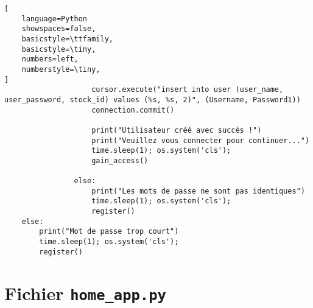 \begin{lstlisting}[
    language=Python
    showspaces=false,
    basicstyle=\ttfamily,
    basicstyle=\tiny,
    numbers=left,
    numberstyle=\tiny,
]
                    cursor.execute("insert into user (user_name, user_password, stock_id) values (%s, %s, 2)", (Username, Password1))
                    connection.commit()

                    print("Utilisateur créé avec succès !")
                    print("Veuillez vous connecter pour continuer...")
                    time.sleep(1); os.system('cls');
                    gain_access()

                else:
                    print("Les mots de passe ne sont pas identiques")
                    time.sleep(1); os.system('cls');
                    register()
    else:
        print("Mot de passe trop court")
        time.sleep(1); os.system('cls');
        register()
\end{lstlisting}

\section{Fichier \texttt{home\_app.py}}


